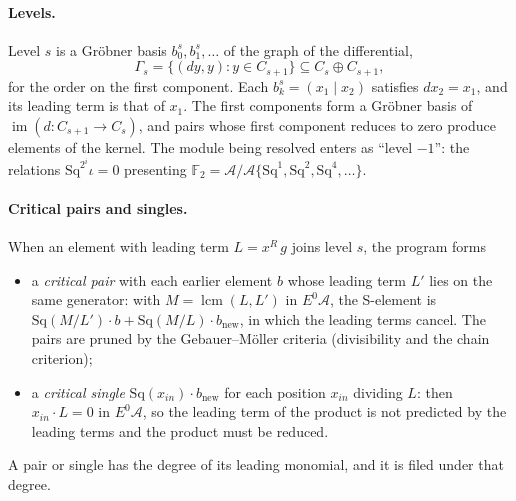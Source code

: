 \documentclass[11pt]{article}
\newcommand{\Sq}{\mathrm{Sq}}
\newcommand{\F}{\mathbb{F}_2}
\newcommand{\A}{\mathcal{A}}
\begin{document}
\paragraph{Levels.}
Level $s$ is a Gröbner basis $b^s_0, b^s_1, \dots$ of the graph of the differential,
\[ \Gamma_s = \{ (d y, y) : y \in C_{s+1} \} \subseteq C_s \oplus C_{s+1}, \]
for the order on the first component. Each $b^s_k = (x_1 \mid x_2)$ satisfies $d x_2 = x_1$,
and its leading term is that of $x_1$. The first components form a Gröbner basis of
$\operatorname{im}(d \colon C_{s+1} \to C_s)$, and pairs whose first component reduces to zero
produce elements of the kernel. The module being resolved enters as ``level $-1$'': the relations
$\Sq^{2^i}\iota = 0$ presenting $\F = \A/\A\{\Sq^1, \Sq^2, \Sq^4, \dots\}$.

\paragraph{Critical pairs and singles.}
When an element with leading term $L = x^{R}\,g$ joins level $s$, the program forms
\begin{itemize}
\item a \emph{critical pair} with each earlier element $b$ whose leading term $L'$ lies on the
  same generator: with $M = \operatorname{lcm}(L, L')$ in $E^0\A$, the S-element is
  $\Sq(M/L')\cdot b + \Sq(M/L)\cdot b_{\text{new}}$, in which the leading terms cancel. The pairs
  are pruned by the Gebauer--Möller criteria (divisibility and the chain criterion);
\item a \emph{critical single} $\Sq(x_{in}) \cdot b_{\text{new}}$ for each position $x_{in}$
  dividing $L$: then $x_{in} \cdot L = 0$ in $E^0\A$, so the leading term of the product is not
  predicted by the leading terms and the product must be reduced.
\end{itemize}
A pair or single has the degree of its leading monomial, and it is filed under that degree.
\end{document}

